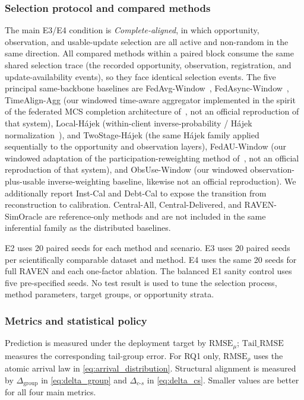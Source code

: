 \documentclass[letterpaper,journal]{IEEEtran}
\begin{document}
\subsubsection{Selection protocol and compared methods}

The main E3/E4 condition is \emph{Complete-aligned}, in which opportunity,
observation, and usable-update selection are all active and non-random in the
same direction.  All compared methods within a paired block consume the same
shared selection trace (the recorded opportunity, observation, registration,
and update-availability events), so they face identical selection events.
The five principal same-backbone baselines are
FedAvg-Window~\cite{mcmahan2017communication},
FedAsync-Window~\cite{xie2019asynchronous},
TimeAlign-Agg (our windowed time-aware aggregator implemented in the spirit of
the federated MCS completion architecture of~\cite{wang2026federated}, not an
official reproduction of that system),
Local-H\'ajek (within-client inverse-probability / H\'ajek
normalization~\cite{horvitz1952generalization,hajek1971comment}), and
TwoStage-H\'ajek (the same H\'ajek family applied sequentially to the
opportunity and observation layers), FedAU-Window (our windowed adaptation
of the participation-reweighting method of~\cite{wang2024lightweight}, not an
official reproduction of that system), and ObsUse-Window (our windowed
observation-plus-usable inverse-weighting baseline, likewise not an official
reproduction).  We additionally report Inst-Cal and
Debt-Cal to expose the transition from reconstruction to calibration.  Central-All,
Central-Delivered, and RAVEN-SimOracle are reference-only methods and are not
included in the same inferential family as the distributed baselines.

E2 uses 20 paired seeds for each method and scenario.  E3 uses 20 paired seeds
per scientifically comparable dataset and method.  E4 uses the same 20 seeds
for full RAVEN and each one-factor ablation.  The balanced E1 sanity control
uses five pre-specified seeds.  No test result is used to tune the selection process,
method parameters, target groups, or opportunity strata.

\subsubsection{Metrics and statistical policy}

Prediction is measured under the deployment target by $\mathrm{RMSE}_{\mu}$;
$\mathrm{Tail\_RMSE}$ measures the corresponding tail-group error.
For RQ1 only, $\mathrm{RMSE}_{\rho}$ uses the atomic arrival law in
\eqref{eq:arrival_distribution}.  Structural alignment is measured by
$\Delta_{\mathrm{group}}$ in \eqref{eq:delta_group} and
$\Delta_{c\text{-}s}$ in \eqref{eq:delta_cs}.  Smaller values are better for
all four main metrics.
\end{document}

